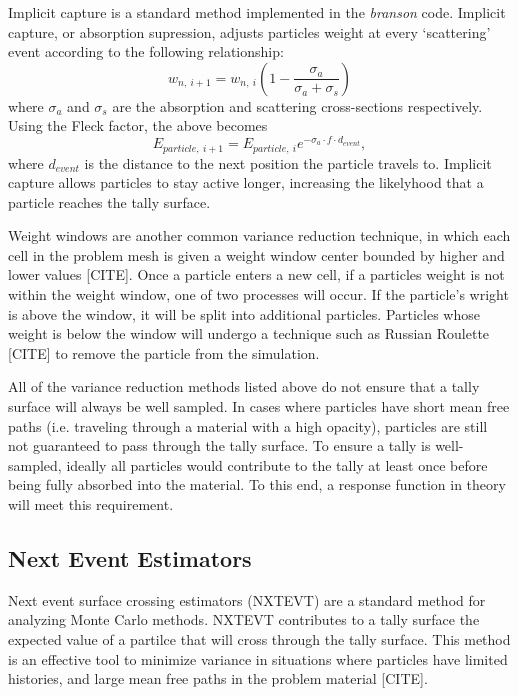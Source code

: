 \documentclass[]{article}
\begin{document}
		Implicit capture is a standard method implemented in the \textit{branson} code. Implicit capture, or absorption supression, adjusts particles weight at every `scattering' event according to the following relationship:
		\begin{equation}
			w_{n,~i+1} = w_{n,~i}(1 - \frac{\sigma_{a}}{\sigma_{a} + \sigma_{s}})
		\end{equation}
		where $\sigma_{a}$ and $\sigma_{s}$ are the absorption and scattering cross-sections respectively. Using the Fleck factor, the above becomes
		\begin{equation}
			E_{particle,~i+1} = E_{particle,~i}e^{-\sigma_{a} \cdot f \cdot d_{event}},
		\end{equation}
		where $d_{event}$ is the distance to the next position the particle travels to. Implicit capture allows particles to stay active longer, increasing the likelyhood that a particle reaches the tally surface.

		Weight windows are another common variance reduction technique, in which each cell in the problem mesh is given a weight window center bounded by higher and lower values [CITE]. Once a particle enters a new cell, if a particles weight is not within the weight window, one of two processes will occur. If the particle's wright is above the window, it will be split into additional particles. Particles whose weight is below the window will undergo a technique such as Russian Roulette [CITE] to remove the particle from the simulation.

		All of the variance reduction methods listed above do not ensure that a tally surface will always be well sampled. In cases where particles have short mean free paths (i.e. traveling through a material with a high opacity), particles are still not guaranteed to pass through the tally surface. To ensure a tally is  well-sampled, ideally all particles would contribute to the tally at least once before being fully absorbed into the material. To this end, a response function in theory will meet this requirement.

	\subsection{Next Event Estimators}
		Next event surface crossing estimators (NXTEVT) are a standard method for analyzing Monte Carlo methods. NXTEVT contributes to a tally surface the expected value of a partilce that will cross through the tally surface. This method is an effective tool to minimize variance in situations where particles have limited histories, and large mean free paths in the problem material [CITE].
\end{document}
